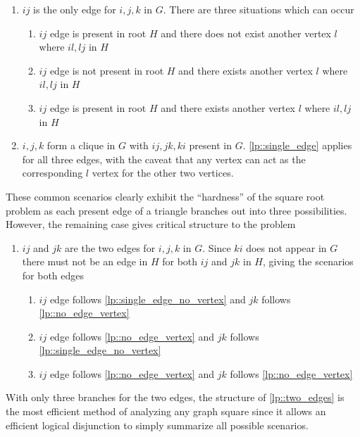 \documentclass[11pt]{article}
\begin{document}
\begin{enumerate}[label=(\Roman*)]
  \item \label{lp::single_edge} $ij$ is the only edge for $i,j,k$ in $G$. There are three situations which can occur  
  \begin{enumerate}[label=(\roman*)]
    \item \label{lp::single_edge_no_vertex} $ij$ edge is present in root $H$ and there does not exist another vertex $l$ where $il, lj$ in $H$
    \item \label{lp::no_edge_vertex} $ij$ edge is not present in root $H$ and there exists another vertex $l$ where $il, lj$ in $H$
    \item \label{lp::edge_vertex} $ij$ edge is present in root $H$ and there exists another vertex $l$ where $il, lj$ in $H$
  \end{enumerate}
  \item \label{lp::three_edges} $i,j,k$ form a clique in $G$ with $ij, jk, ki$ present in $G$. \ref{lp::single_edge} applies for all three 
  edges, with the caveat that any vertex can act as the corresponding $l$ vertex for the other two vertices. 
\end{enumerate}
These common scenarios clearly exhibit the ``hardness'' of the square root problem as each present edge of a triangle branches out into three possibilities. However, the remaining case gives critical structure to the problem 
\begin{enumerate}[resume, label=(\Roman*)]
  \item \label{lp::two_edges} $ij$ and $jk$ are the two edges for $i,j,k$ in $G$. Since $ki$ does not appear in $G$ there must not be an edge in $H$ for both $ij$ and $jk$ in $H$, giving the scenarios for both edges
  \begin{enumerate}[label=(\arabic*)] 
    \item \label{lp::two_edges_single_edge_1} $ij$ edge follows \ref{lp::single_edge_no_vertex} and $jk$ follows \ref{lp::no_edge_vertex}
    \item \label{lp::two_edges_single_edge_2} $ij$ edge follows \ref{lp::no_edge_vertex} and $jk$ follows \ref{lp::single_edge_no_vertex}
    \item \label{lp::two_edges_no_edges} $ij$ edge follows \ref{lp::no_edge_vertex} and $jk$ follows \ref{lp::no_edge_vertex}
  \end{enumerate}
\end{enumerate}
With only three branches for the two edges, the structure of \ref{lp::two_edges} is the most efficient method of analyzing any graph square since it allows an efficient logical disjunction to simply summarize all possible scenarios. 
\end{document}
